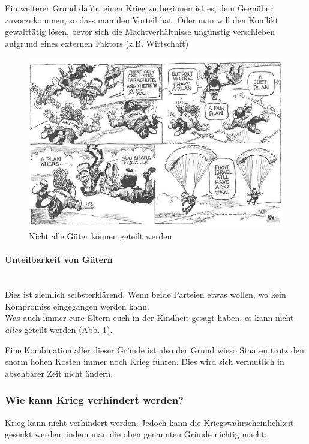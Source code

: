 \documentclass[a4paper, 11pt]{article}
\begin{document}
\vspace{10px}

Ein weiterer Grund dafür, einen Krieg zu beginnen ist es, dem Gegnüber zuvorzukommen, so dass man den Vorteil hat. Oder man will den Konflikt gewalttätig lösen, bevor sich die Machtverhältnisse ungünstig verschieben aufgrund eines externen Faktors (z.B. Wirtschaft)

\begin{figure}
	\centering
	\includegraphics[keepaspectratio=true,height=10\baselineskip]{indivisablegoods.png}
	\caption{Nicht alle Güter können geteilt werden}
    \label{fig:indivisablegoods}
\end{figure}

\paragraph{Unteilbarkeit von Gütern} \mbox{} \\

Dies ist ziemlich selbsterklärend. Wenn beide Parteien etwas wollen, wo kein Kompromiss eingegangen werden kann. \\
Was auch immer eure Eltern euch in der Kindheit gesagt haben, es kann nicht \textit{alles} geteilt werden (Abb. \ref{fig:indivisablegoods}). 

\vspace{20px}

Eine Kombination aller dieser Gründe ist also der Grund wieso Staaten trotz den enorm hohen Kosten immer noch Krieg führen. Dies wird sich vermutlich in absehbarer Zeit nicht ändern.


\subsubsection{Wie kann Krieg verhindert werden?}
Krieg kann nicht verhindert werden. Jedoch kann die Kriegswahrscheinlichkeit gesenkt werden, indem man die oben genannten Gründe nichtig macht:
\end{document}
